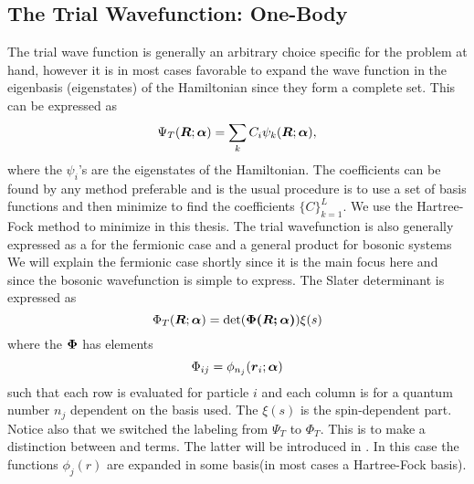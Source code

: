     \subsection{The Trial Wavefunction: One-Body}
        The trial wave function is generally an arbitrary choice specific for
        the problem at hand, however it is in most cases favorable to expand
        the wave function in the eigenbasis (eigenstates) of the Hamiltonian
        since they form a complete set. This can be expressed as
            \begin{equation}
                {\Psi}_T(\boldsymbol{{R}};\boldsymbol{{\alpha}}) = \sum_k C_i\psi_k(\boldsymbol{{R}};\boldsymbol{{\alpha}}),
            \end{equation}
        where the $\psi_i$'s are the eigenstates of the Hamiltonian. The
        coefficients can be found by any method preferable and is the usual
        procedure is to use a set of basis functions and then minimize to find
        the coefficients $\{C\}_{k=1}^L$. We use the Hartree-Fock method to
        minimize in this thesis. The trial wavefunction is also generally
        expressed as a  for the fermionic case and a
        general product for bosonic systems\cite{GriffQuan, NeOr, FeWa, DiVNe}
        We will explain the fermionic case shortly since it is the main focus
        here and since the bosonic wavefunction is simple to express. The
        Slater determinant is expressed as
            \begin{equation}
                {\Phi}_T(\boldsymbol{{R}};\boldsymbol{{\alpha}}) = \det(\boldsymbol{{\Phi(\boldsymbol{{R}};\boldsymbol{{\alpha}})}}) \xi(s)
            \end{equation}
        where the  $\boldsymbol{{\Phi}}$ has elements
            \begin{equation}
                \Phi_{ij} = \phi_{n_j}(\boldsymbol{{r}}_i;\boldsymbol{{\alpha}})
            \end{equation}
        such that each row is evaluated for particle $i$ and each column is for
        a quantum number $n_j$ dependent on the basis used. The $\xi(s)$ is the
        spin-dependent part. Notice also that we switched the labeling from
        $\Psi_T$ to $\Phi_T$. This is to make a distinction between
         and  terms. The latter will be
        introduced in . In this case the
         functions $\phi_j(r)$ are expanded in some
        basis(in most cases a Hartree-Fock basis).

